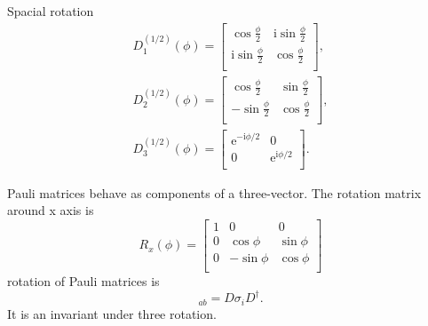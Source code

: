 Spacial rotation
\begin{equation}
  \begin{gathered}
        D_1^{(1 / 2)} (\phi) = \begin{bmatrix}
            \cos \frac{\phi}{2} & \mathrm{i} \sin \frac{\phi}{2}\\
            \mathrm{i} \sin \frac{\phi}{2} & \cos \frac{\phi}{2}\\
        \end{bmatrix},\\
        D_2^{(1 / 2)} (\phi) = \begin{bmatrix}
            \cos \frac{\phi}{2} & \sin \frac{\phi}{2}\\
            -\sin \frac{\phi}{2} & \cos \frac{\phi}{2}\\
        \end{bmatrix},\\
        D_3^{(1 / 2)} (\phi) = \begin{bmatrix}
            \mathrm{e}^{-\mathrm{i} \phi / 2} & 0\\
            0 & \mathrm{e}^{\mathrm{i} \phi / 2}\\
        \end{bmatrix}.
  \end{gathered}
\end{equation}

Pauli matrices behave as components of a three-vector. The rotation matrix around x axis is 
\begin{equation}
  R_{x} \left( \phi \right) = \begin{bmatrix}
   1 & 0 & 0\\
   0 & \cos \phi & \sin \phi\\
   0 & -\sin \phi & \cos \phi\\
  \end{bmatrix}
\end{equation}
rotation of Pauli matrices is
\begin{equation}
  [\sigma_{i}]_{ab} = D \sigma_i D^{\dagger}.
\end{equation}
It is an invariant under three rotation.

